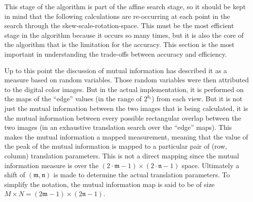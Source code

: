 %
%
%
%
%
%
%
%
%

%
%
%



This stage of the algorithm is part of the affine search stage, so it should be kept in mind that the following calculations are re-occurring at each point in the search through the skew-scale-rotation-space. This must be the most efficient stage in the algorithm because it occurs so many times, but it is also the core of the algorithm that is the limitation for the accuracy. This section is the most important in understanding the trade-offs between accuracy and efficiency.

Up to this point the discussion of mutual information has described it as a measure based on random variables. Those random variables were then attributed to the digital color images. But in the actual implementation, it is performed on the maps of the ``edge'' values (in the range of $2^{b_{e}}$) from each view. But it is not just the mutual information between the two images that is being calculated, it is the mutual information between every possible rectangular overlap between the two images (in an exhaustive translation search over the ``edge'' maps). This makes the mutual information a mapped measurement, meaning that the value of the peak of the mutual information is mapped to a particular pair of (row, column) translation parameters. This is not a direct mapping since the mutual information measure is over the $(2\cdot\mathfrak{m}-1)\times(2\cdot\mathfrak{n}-1)$ space. Ultimately a shift of $\left(\mathfrak{m}, \mathfrak{n}\right)$ is made to determine the actual translation parameters. To simplify the notation, the mutual information map is said to be of size $M\times N = (2\mathfrak{m}-1) \times (2\mathfrak{n}-1)$.


